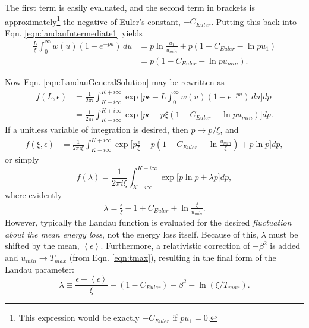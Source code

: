 The first term is easily evaluated, and the second term in brackets is approximately\footnote{This expression would be exactly $-C_{Euler}$ if $pu_1=0$.} the negative of Euler's constant, $-C_{Euler}$. Putting this back into Eqn. \ref{eqn:landauIntermediate1} yields
\begin{align*}
\frac{L}{\xi}\int_0 ^\infty w(u)  (1-e^{-pu})\, du &=p \ln\frac{u_1}{u_{min}} + p(1-C_{Euler}-\ln pu_1)\\
&=p(1-C_{Euler}-\ln pu_{min}).
\end{align*}

Now Eqn. \ref{eqn:LandauGeneralSolution} may be rewritten as
\begin{align*}
f(L,\epsilon)&=\frac{1}{2\pi i} \int_{K-i\infty} ^{K+i\infty} \exp\Big[p\epsilon-L\int_0 ^\infty w(u)  (1-e^{-pu})\, du\Big] dp\\
&= \frac{1}{2\pi i} \int_{K-i\infty} ^{K+i\infty} \exp\Big[p\epsilon-p\xi(1-C_{Euler}-\ln pu_{min})\Big] dp.
\end{align*}
If a unitless variable of integration is desired, then $p\rightarrow p/\xi$, and
\begin{align*}
f(\xi,\epsilon)&=\frac{1}{2\pi i \xi} \int_{K-i\infty} ^{K+i\infty} \exp\Big[p\frac{\epsilon}{\xi}-p(1-C_{Euler}-\ln \frac{u_{min}}{\xi})+p\ln p\Big] dp,
\end{align*}
or simply
\begin{equation}\label{eqn:landau}
f(\lambda)=\frac{1}{2\pi i \xi} \int_{K-i\infty} ^{K+i\infty} \exp\Big[p\ln p + \lambda p\Big] dp,
\end{equation}
where evidently
\begin{align*}
\lambda = \frac{\epsilon}{\xi} -1+C_{Euler}+\ln \frac{\xi}{u_{min}}.
\end{align*}
However, typically the Landau function is evaluated for the desired \emph{fluctuation about the mean energy loss}, not the energy loss itself. Because of this, $\lambda$ must be shifted by the mean, $\left< \epsilon \right>$. Furthermore, a relativistic correction of $-\beta ^2$ is added and $u_{min}\rightarrow T_{max}$ (from Eqn. \ref{eqn:tmax}), resulting in the final form of the Landau parameter:
\begin{equation}\label{eqn:landauParameter}
\lambda \equiv \frac{\epsilon-\left<\epsilon\right>}{\xi}-(1-C_{Euler})-\beta ^2 -\ln (\xi/T_{max}).
\end{equation}


